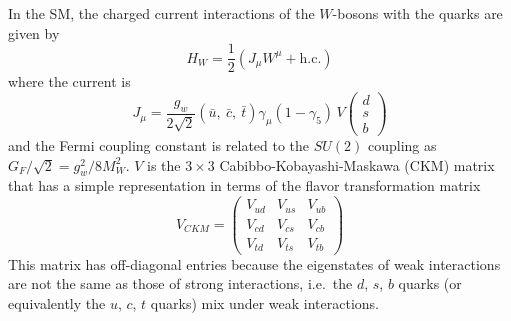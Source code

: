 In the SM, the charged current interactions of the $W$-bosons with the
quarks are given by
\begin{equation}
H_W = \frac{1}{2} \left( J_\mu W^\mu + \text{h.c.} \right)
\label{eq:hw}
\end{equation}
where the current is
\begin{equation}
J_\mu = \frac{g_w}{2\sqrt{2}} \left( \bar{u},\ \bar{c},\ \bar{t} \right)
\gamma_\mu (1 - \gamma_5)\, V
\begin{pmatrix} d \\ s \\ b \end{pmatrix}
\label{eq:jmu}
\end{equation}
and the Fermi coupling constant is related to the $SU(2)$ coupling as
$G_F / \sqrt{2} = g_w^2 / 8 M_W^2$. $V$ is the $3 \times 3$
Cabibbo-Kobayashi-Maskawa (CKM) matrix that has a simple representation in
terms of the flavor transformation matrix
\begin{equation}
V_{CKM} =
\begin{pmatrix}
V_{ud} & V_{us} & V_{ub} \\
V_{cd} & V_{cs} & V_{cb} \\
V_{td} & V_{ts} & V_{tb}
\end{pmatrix}
\label{eq:ckm}
\end{equation}
This matrix has off-diagonal entries because the eigenstates of weak
interactions are not the same as those of strong interactions, i.e.\ the
$d$, $s$, $b$ quarks (or equivalently the $u$, $c$, $t$ quarks) mix under
weak interactions.

